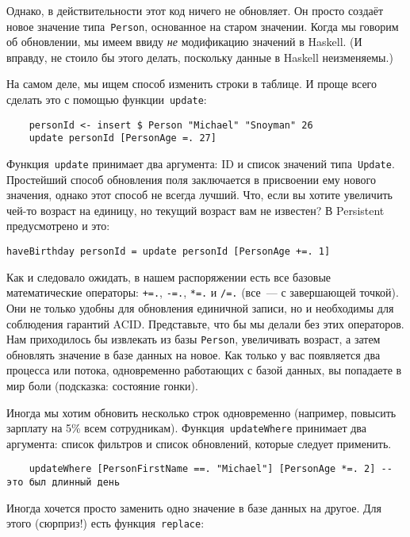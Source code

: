 Однако, в действительности этот код ничего не обновляет. Он просто создаёт
новое значение типа~\lstinline'Person', основанное на старом значении. Когда мы
говорим об обновлении, мы имеем ввиду \emph{не} модификацию значений в Haskell.
(И вправду, не стоило бы этого делать, поскольку данные в Haskell неизменяемы.)

На самом деле, мы ищем способ изменить строки в таблице. И проще всего сделать
это с помощью функции~\lstinline'update':

\begin{lstlisting}
    personId <- insert $ Person "Michael" "Snoyman" 26
    update personId [PersonAge =. 27]
\end{lstlisting}

Функция~\lstinline'update' принимает два аргумента: ID и список значений
типа~\lstinline'Update'. Простейший способ обновления поля заключается в
присвоении ему нового значения, однако этот способ не всегда лучший. Что, если вы
хотите увеличить чей-то возраст на единицу, но текущий возраст вам не известен?
В Persistent предусмотрено и это:

\begin{lstlisting}
haveBirthday personId = update personId [PersonAge +=. 1]
\end{lstlisting}

Как и следовало ожидать, в нашем распоряжении есть все базовые математические
операторы: \lstinline'+=.', \lstinline'-=.', \lstinline'*=.' и \lstinline'/=.'
(все~--- с завершающей точкой). Они не только удобны для обновления единичной
записи, но и необходимы для соблюдения гарантий ACID. Представьте, что бы мы
делали без этих операторов. Нам приходилось бы извлекать из базы
\lstinline'Person', увеличивать возраст, а затем обновлять значение в базе
данных на новое. Как только у вас появляется два процесса или потока,
одновременно работающих с базой данных, вы попадаете в мир боли (подсказка:
состояние гонки).

Иногда мы хотим обновить несколько строк одновременно (например, повысить
зарплату на 5\% всем сотрудникам). Функция~\lstinline'updateWhere' принимает
два аргумента: список фильтров и список обновлений, которые следует применить.

\begin{lstlisting}
    updateWhere [PersonFirstName ==. "Michael"] [PersonAge *=. 2] -- это был длинный день
\end{lstlisting}

Иногда хочется просто заменить одно значение в базе данных на другое. Для этого
(сюрприз!) есть функция~\lstinline'replace':

